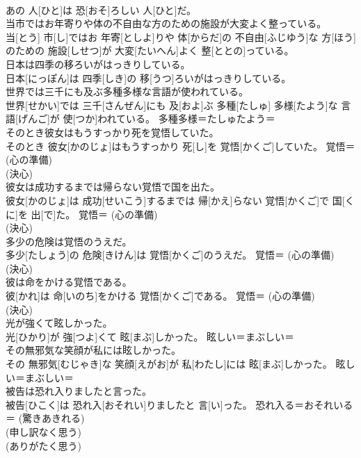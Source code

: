 \documentclass[8pt]{extreport}
\begin{document}
\begin{CJK}{UTF8}{min}
{\\	あの 人[ひと]は 恐[おそ]ろしい 人[ひと]だ。	
\\	当市ではお年寄りや体の不自由な方のための施設が大変よく整っている。	
\\	当[とう] 市[し]ではお 年寄[としよ]りや 体[からだ]の 不自由[ふじゆう]な 方[ほう]のための 施設[しせつ]が 大変[たいへん]よく 整[ととの]っている。	
\\	日本は四季の移ろいがはっきりしている。	
\\	日本[にっぽん]は 四季[しき]の 移[うつ]ろいがはっきりしている。	
\\	世界では三千にも及ぶ多種多様な言語が使われている。	
\\	世界[せかい]では 三千[さんぜん]にも 及[およ]ぶ 多種[たしゅ] 多様[たよう]な 言語[げんご]が 使[つか]われている。	多種多様＝たしゅたよう＝ 
\\	そのとき彼女はもうすっかり死を覚悟していた。	
\\	そのとき 彼女[かのじょ]はもうすっかり 死[し]を 覚悟[かくご]していた。	覚悟＝ (心の準備) 
\\	(決心) 
\\	彼女は成功するまでは帰らない覚悟で国を出た。	
\\	彼女[かのじょ]は 成功[せいこう]するまでは 帰[かえ]らない 覚悟[かくご]で 国[くに]を 出[で]た。	覚悟＝ (心の準備) 
\\	(決心) 
\\	多少の危険は覚悟のうえだ。	
\\	多少[たしょう]の 危険[きけん]は 覚悟[かくご]のうえだ。	覚悟＝ (心の準備) 
\\	(決心) 
\\	彼は命をかける覚悟である。	
\\	彼[かれ]は 命[いのち]をかける 覚悟[かくご]である。	覚悟＝ (心の準備) 
\\	(決心) 
\\	光が強くて眩しかった。	
\\	光[ひかり]が 強[つよ]くて 眩[まぶ]しかった。	眩しい＝まぶしい＝ 
\\	その無邪気な笑顔が私には眩しかった。	
\\	その 無邪気[むじゃき]な 笑顔[えがお]が 私[わたし]には 眩[まぶ]しかった。	眩しい＝まぶしい＝ 
\\	被告は恐れ入りましたと言った。	
\\	被告[ひこく]は 恐れ入[おそれい]りましたと 言[い]った。	恐れ入る＝おそれいる＝ (驚きあきれる) 
\\	(申し訳なく思う) 
\\	(ありがたく思う) 
}
\end{CJK}
\end{document}
